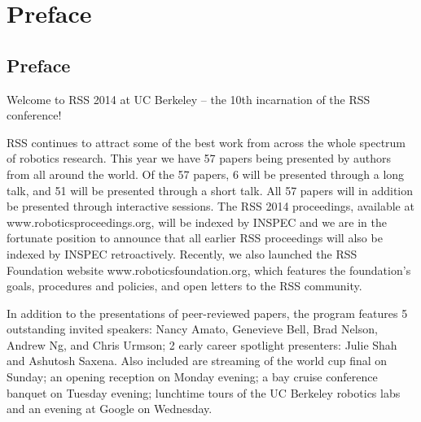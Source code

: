 
\chapter*{Preface}


                                                                     
                                             
\vspace{3cm}
\section*{Preface}
\begingroup{}
\Large
\vspace{1cm}

Welcome to RSS 2014 at UC Berkeley – the 10th incarnation of the RSS conference! 

\vspace{1mm}

RSS continues to attract some of the best work from across the whole spectrum of robotics research. This year we have 57 papers being presented by authors from all around the world. Of the 57 papers, 6 will be presented through a long talk, and 51 will be presented through a short talk.  All 57 papers will in addition be presented through interactive sessions. The RSS 2014 proceedings, available at www.roboticsproceedings.org, will be indexed by INSPEC and we are in the fortunate position to announce that all earlier RSS proceedings will also be indexed by INSPEC retroactively. Recently, we also launched the RSS Foundation website www.roboticsfoundation.org, which features the foundation’s goals, procedures and policies, and open letters to the RSS community.

\vspace{1mm}

In addition to the presentations of peer-reviewed papers, the program features 5 outstanding invited speakers: Nancy Amato, Genevieve Bell, Brad Nelson, Andrew Ng, and Chris Urmson; 2 early career spotlight presenters: Julie Shah and Ashutosh Saxena. Also included are streaming of the world cup final on Sunday; an opening reception on Monday evening; a bay cruise conference banquet on Tuesday evening; lunchtime tours of the UC Berkeley robotics labs and an evening at Google on Wednesday.

\vspace{1mm}

